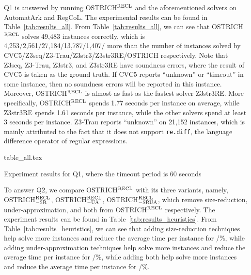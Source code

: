 Q1 is answered by running OSTRICH$^{\rm RECL}$ and the aforementioned solvers on AutomatArk and RegCoL. The experimental results can be found in Table~\ref{tab:results_all}. From Table~\ref{tab:results_all}, we can see that OSTRICH$^{\rm RECL}$ solves 49,483 instances correctly, which is 4,253/2,561/27,184/13,787/1,407/ more than the number of instances solved by CVC5/Z3seq/Z3-Trau/Z3str3/Z3str3RE/OSTRICH respectively. 
%    
Note that Z3seq, Z3-Trau, Z3str3, and Z3str3RE have soundness errors, where the result of CVC5 is taken as the ground truth. If CVC5 reports ``unknown'' or ``timeout'' in some instance, then no soundness errors will be reported in this instance. 
%
Moreover, OSTRICH$^{\rm RECL}$ is almost as fast as the fastest solver Z3str3RE. More specifically, OSTRICH$^{\rm RECL}$ spends 1.77 seconds per instance on average, while Z3str3RE spends 1.61 seconds per instance, while the other solvers spend at least 3 seconds per instance.  
Z3-Trau reports ``unknown'' on 21,152 instances, which is mainly attributed to the fact that it does not support \verb|re.diff|, the language difference operator of regular expressions. 


\begin{table}[ht]
\begin{center}
  {table_all.tex}
\end{center}
  \caption{Experiment results for Q1, where the timeout period is 60 seconds}
  \label{tab:results_all}
\end{table}


To answer Q2, we compare OSTRICH$^{\rm RECL}$ with its three variants, namely, OSTRICH$^{\rm RECL}_{\rm -SR}$, OSTRICH$^{\rm RECL}_{\rm -UA}$, OSTRICH$^{\rm RECL}_{\rm -SRUA}$, which remove size-reduction, under-approximation, and both from OSTRICH$^{\rm RECL}$ respectively. The experiment results can be found in Table~\ref{tab:results_heuristics}.
From Table~\ref{tab:results_heuristics}, we can see that adding size-reduction techniques help solve  more instances and reduce the average time per instance for /\%, while adding under-approximation techniques help solve  more instances and reduce the average time per instance for /\%, while adding both help solve  more instances and reduce the average time per instance for /\%. 


